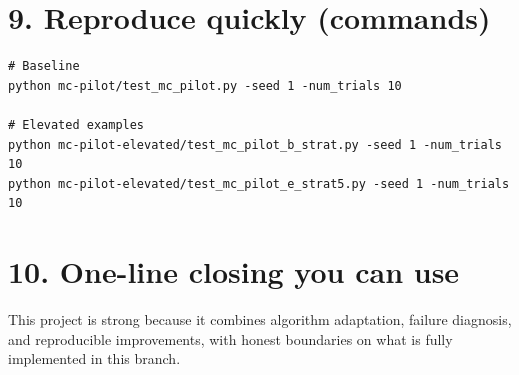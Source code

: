 \documentclass[11pt]{article}
\begin{document}
\section*{9. Reproduce quickly (commands)}
\begin{lstlisting}[style=py]
# Baseline
python mc-pilot/test_mc_pilot.py -seed 1 -num_trials 10

# Elevated examples
python mc-pilot-elevated/test_mc_pilot_b_strat.py -seed 1 -num_trials 10
python mc-pilot-elevated/test_mc_pilot_e_strat5.py -seed 1 -num_trials 10
\end{lstlisting}

\section*{10. One-line closing you can use}
This project is strong because it combines algorithm adaptation, failure diagnosis, and reproducible improvements, with honest boundaries on what is fully implemented in this branch.
\end{document}
